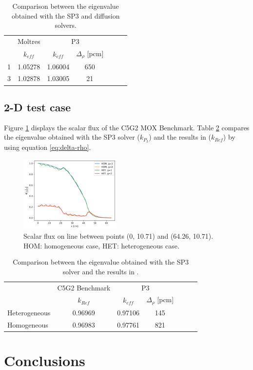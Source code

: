 \documentclass[letterpaper]{article}
\begin{document}
\begin{table}[htbp!]
\centering
\caption{Comparison between the eigenvalue obtained with the SP3 and diffusion solvers.}
\begin{tabular}{lcccccc}
\toprule
 & Moltres      & \multicolumn{2}{c}{P3}          \\
 & $k_{eff}$    & $k_{eff}$ & $\Delta_\rho$ [pcm] \\
\midrule
1 & 1.05278     & 1.06004   & 650 \\
3 & 1.02878     & 1.03005   & 21  \\
\bottomrule
\end{tabular}
\label{tab:1d-keff}
\end{table}

\subsection{2-D test case}
\label{sec:results2d}

Figure \ref{res:2d-bench} displays the scalar flux of the C5G2 MOX Benchmark.
Table \ref{tab:2d-keff} compares the eigenvalue obtained with the SP3 solver ($k_{P_3}$) and the results in \cite{capilla_applications_2009} ($k_{Ref}$) by using equation \ref{eq:delta-rho}.

\begin{figure}[h!]
    \centering
    \includegraphics[width=0.45\textwidth]{../C5G2-benchmark/output-2g}
    \caption{Scalar flux on line between points (0, 10.71) and (64.26, 10.71). HOM: homogeneous case, HET: heterogeneous case.}
    \label{res:2d-bench}
\end{figure}

\begin{table}[htbp!]
\centering
\caption{Comparison between the eigenvalue obtained with the SP3 solver and the results in \cite{capilla_applications_2009}.}
\begin{tabular}{lcccccc}
\toprule
 & C5G2 Benchmark      & \multicolumn{2}{c}{P3}          \\
 & $k_{Ref}$           & $k_{eff}$ & $\Delta_\rho$ [pcm] \\
\midrule
Heterogeneous & 0.96969  & 0.97106  & 145  \\
Homogeneous   & 0.96983  & 0.97761  & 821  \\
\bottomrule
\end{tabular}
\label{tab:2d-keff}
\end{table}

\section{Conclusions}

\clearpage


\end{document}
